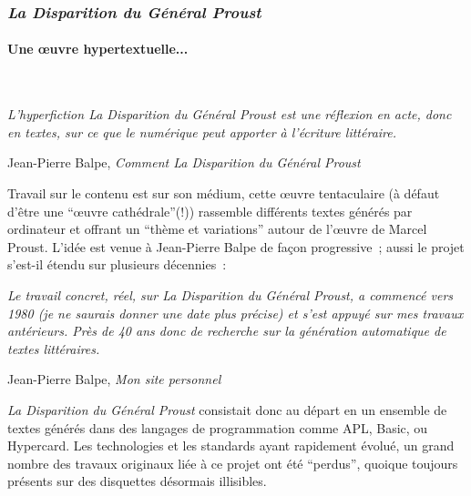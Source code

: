 \documentclass{article}
\newcommand{\subsubsubsection}[1]{\paragraph{#1}\mbox{}\\}
\newenvironment{citationbox}
{\begin{center}
		\begin{minipage}{.8\textwidth}
		}
		{
		\end{minipage}	
\end{center}
}
\begin{document}
			\subsubsection{\textit{La Disparition du Général Proust}}
				\subsubsubsection{Une œuvre hypertextuelle...}
					\begin{citationbox}
						\textit{L'hyperfiction \textit{La Disparition du Général Proust} est une réflexion en acte, donc en textes, sur ce que le numérique peut apporter à l'écriture littéraire.}
						\begin{flushright}
							Jean-Pierre Balpe, \textit{Comment La Disparition du Général Proust} \cite{balpe_blog}
						\end{flushright}
					\end{citationbox}
					Travail sur le contenu est sur son médium, cette œuvre tentaculaire (à défaut d'être une ``œuvre cathédrale''(!)) rassemble différents textes générés par ordinateur et offrant un ``thème et variations'' autour de l'œuvre de Marcel Proust. L'idée est venue à Jean-Pierre Balpe de façon progressive ; aussi le projet s'est-il étendu sur plusieurs décennies :
					\begin{citationbox}
						\textit{Le travail concret, réel, sur \textit{La Disparition du Général Proust}, a commencé vers 1980 (je ne saurais donner une date plus précise) et s'est appuyé sur mes travaux antérieurs. Près de 40 ans donc de recherche sur la génération automatique de textes littéraires.}
						\begin{flushright}
							Jean-Pierre Balpe, \textit{Mon site personnel} \cite{balpe_blog}
						\end{flushright}
					\end{citationbox}
					\textit{La Disparition du Général Proust} consistait donc au départ en un ensemble de textes générés  dans  des langages de programmation comme APL, Basic, ou Hypercard. Les technologies et les standards ayant rapidement évolué, un grand nombre des travaux originaux liée à ce projet ont été ``perdus'',  quoique toujours présents sur des disquettes désormais illisibles.\\
					
\end{document}
